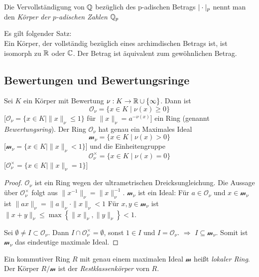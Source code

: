\documentclass[../main.tex]{subfiles}
\begin{document}
\begin{definition}
    Die Vervollständigung von $\mathbb{Q}$ bezüglich des p-adischen Betrags $|\cdot|_p$ nennt man den \emph{Körper der $p$-adischen Zahlen} $\mathbb{Q}_p$
\end{definition}

\begin{remark}
    Es gilt folgender Satz:\\
    Ein Körper, der vollständig bezüglich eines archimdischen Betrags ist, ist isomorph zu $\mathbb{R}$ oder $\mathbb{C}$. Der Betrag ist äquivalent zum gewöhnlichen Betrag.
\end{remark}

\subsection{Bewertungen und Bewertungsringe}
\begin{theorem}\label{theo:4.23}
    Sei $K$ ein Körper mit Bewertung $\nu:K\rightarrow\mathbb{R}\cup \{\infty\}$.
    Dann ist $$\mathcal{O}_\nu = \{x\in K\mid \nu(x)\geq0\}$$ [$\mathcal{O}_\nu = \{x\in K\mid \|x\|_\nu \leq 1\}$ für $\|x\|_\nu = a^{-\nu(x)}$] ein Ring (genannt \emph{Bewertungsring}).
    Der Ring $\mathcal{O}_\nu$ hat genau ein Maximales Ideal $$\mathcal{m}_\nu = \{x\in K\mid \nu(x)>0\}$$ [$\mathcal{m}_\nu = \{x\in K\mid \|x\|_\nu <1\}$]
    und die Einheitengruppe $$\mathcal{O}_\nu^\times = \{x\in K\mid \nu(x) = 0\}$$ [$\mathcal{O}_\nu^\times = \{x\in K\mid \|x\|_\nu = 1\}$]
\end{theorem}
\begin{proof}
    $\mathcal{O}_\nu$ ist ein Ring wegen der ultrametrischen Dreicksungleichung.
    Die Aussage über $\mathcal{O}_\nu^\times$ folgt aus $\|x^{-1}\|_\nu = \|x\|_\nu^{-1}$.
    $\mathcal{m}_\nu$ ist ein Ideal: Für $a\in \mathcal{O}_\nu$ und $x\in \mathcal{m}_\nu$ ist $\|ax\|_\nu = \|a\|_\nu \cdot \|x\|_\nu < 1$
    Für $x,y\in \mathcal{m}_\nu$ ist $\|x+y\|_\nu \leq \max\left\{\|x\|_\nu, \|y\|_\nu\right\} < 1$.

    Sei $\emptyset\neq I\subset \mathcal{O}_\nu$. Dann $I\cap \mathcal{O}_\nu^\times = \emptyset$, sonst $1\in I$ und $I=\mathcal{O}_\nu$.
    $\Longrightarrow$ $I\subseteq \mathcal{m}_\nu$.
    Somit ist $\mathcal{m}_\nu$ das eindeutige maximale Ideal.
\end{proof}

\begin{definition}
    Ein kommutiver Ring $R$ mit genau einem maximalen Ideal $\mathcal{m}$ heißt \emph{lokaler Ring}. Der Körper $R/\mathcal{m}$ ist der \emph{Restklassenkörper} vorn $R$.
\end{definition}
\end{document}
